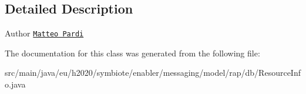 \subsection{Detailed Description}
\begin{DoxyAuthor}{Author}
\href{mailto:m.pardi@nextworks.it}{\tt Matteo Pardi} 
\end{DoxyAuthor}


The documentation for this class was generated from the following file\+:\begin{DoxyCompactItemize}
\item 
src/main/java/eu/h2020/symbiote/enabler/messaging/model/rap/db/Resource\+Info.\+java\end{DoxyCompactItemize}
